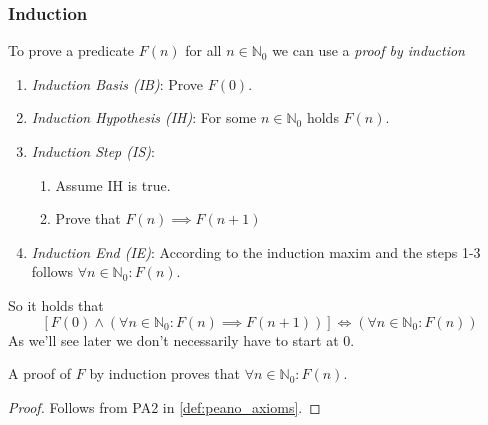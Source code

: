 \subsubsection{Induction}
To prove a predicate \(F(n)\) for all \(n \in \mathbb{N}_0\) we can use a \textit{proof by induction}
\begin{enumerate}
   \item \textit{Induction Basis (IB)}: Prove \(F(0)\).
   \item \textit{Induction Hypothesis (IH)}: For some \(n \in \mathbb{N}_0\) holds \(F(n)\).
   \item \textit{Induction Step (IS)}:
   \begin{enumerate}
      \item Assume IH is true.
      \item Prove that \(F(n) \implies F(n + 1)\)
   \end{enumerate}
\item \textit{Induction End (IE)}: According to the induction maxim and the steps 1-3 follows \(\forall n \in \mathbb{N}_0: F(n)\).
\end{enumerate}
So it holds that
\[[F(0) \land (\forall n \in \mathbb{N}_0: F(n) \implies F(n+1))] \iff (\forall n \in \mathbb{N}_0: F(n))\]
As we'll see later we don't necessarily have to start at 0.

\begin{proposition}
   A proof of \(F\) by induction proves that \(\forall n \in \mathbb{N}_0: F(n)\).
\end{proposition}
\begin{proof}
   Follows from PA2 in \cref{def:peano_axioms}.
\end{proof}

